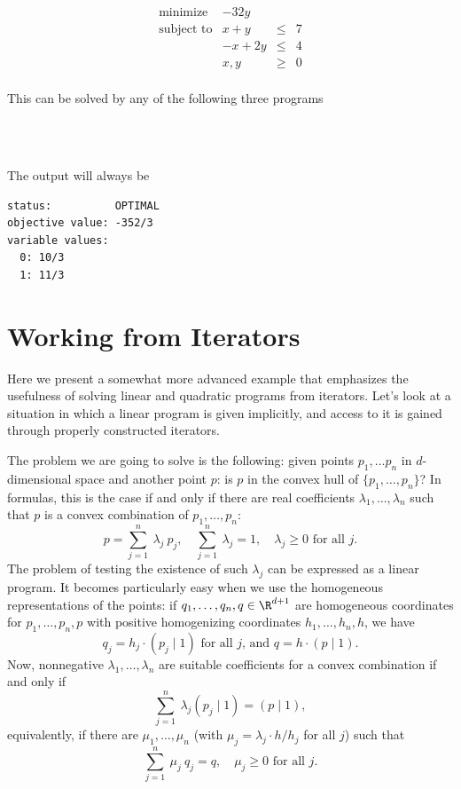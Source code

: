 \[
\begin{array}{lrcl}
\mbox{minimize}       & - 32y \\
\mbox{subject to}     & x + y &\leq& 7 \\
                      & -x + 2y &\leq& 4 \\
                      & x,y &\geq& 0 \\
\end{array}
\] 

This can be solved by any of the following three programs

\\
\\

The output will always be
\begin{verbatim}
status:          OPTIMAL
objective value: -352/3
variable values:
  0: 10/3
  1: 11/3
\end{verbatim}

\section{Working from Iterators\label{sec:QP-iterators}}
Here we present a somewhat more advanced example that emphasizes the
usefulness of solving linear and quadratic programs from iterators. 
Let's look at a situation in which a linear program is given implicitly, 
and access to it is gained through properly constructed iterators.

The problem we are going to solve is the following: given points
$p_1,\ldots p_{n}$ in $d$-dimensional space and another point $p$: is
$p$ in the convex hull of $\{p_1,\ldots,p_{n}\}$? In formulas, this is
the case if and only if there are real coefficients
$\lambda_1,\ldots,\lambda_n$ such that $p$ is a convex combination of
$p_1,\ldots,p_n$: 
\[
p = \sum_{j=1}^{n}~\lambda_j~p_j, \quad \sum_{j=1}^{n}~\lambda_j = 1,
\quad \lambda_j \geq 0 \mbox{~for all $j$.}
\]
The problem of testing the existence of such $\lambda_j$ can 
be expressed as a linear program. It becomes particularly easy
when we use the homogeneous representations of the points: if
$q_1,\ldots,q_n,q\in\R^{d+1}$ are homogeneous coordinates for
$p_1,\ldots,p_n,p$ with positive homogenizing coordinates 
$h_1,\ldots,h_n,h$, we have
\[q_j = h_j \cdot (p_j \mid 1) \mbox{~for all $j$, and~} q = h \cdot
(p\mid 1).\] Now, nonnegative $\lambda_1,\ldots,\lambda_n$ are
suitable coefficients for a convex combination if and only if
\[\sum_{j=1}^n~ \lambda_j(p_j \mid 1) = (p\mid 1), \]
equivalently, if there are $\mu_1,\ldots,\mu_n$ 
(with $\mu_j = \lambda_j \cdot h/{h_j}$ for all $j$) such that
\[
\sum_{j=1}^n~\mu_j~q_j = q, \quad \mu_j \geq 0\mbox{~for all $j$}.
\]

